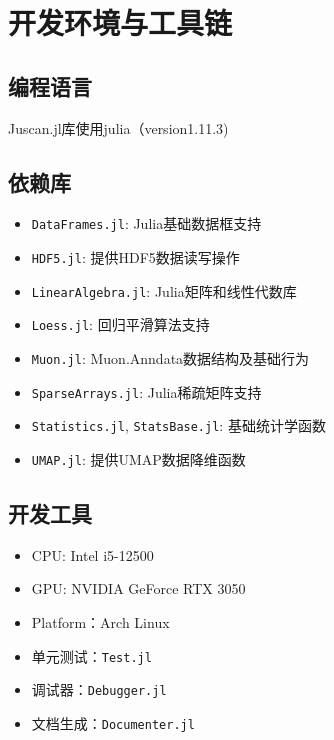 
\section{开发环境与工具链}

\subsection{编程语言}

Juscan.jl库使用julia（version1.11.3)

\subsection{依赖库}

\begin{itemize}
  \setlength{\itemsep}{2pt}
  \item \lstinline|DataFrames.jl|: Julia基础数据框支持
  \item \lstinline|HDF5.jl|: 提供HDF5数据读写操作
  \item \lstinline|LinearAlgebra.jl|: Julia矩阵和线性代数库
  \item \lstinline|Loess.jl|: 回归平滑算法支持
  \item \lstinline|Muon.jl|: Muon.Anndata数据结构及基础行为
  \item \lstinline|SparseArrays.jl|: Julia稀疏矩阵支持
  \item \lstinline|Statistics.jl|, \lstinline|StatsBase.jl|: 基础统计学函数
  \item \lstinline|UMAP.jl|: 提供UMAP数据降维函数
\end{itemize}

\subsection{开发工具}

\begin{itemize}
  \setlength{\itemsep}{2pt}
  \item CPU: Intel i5-12500
  \item GPU: NVIDIA GeForce RTX 3050
  \item Platform：Arch Linux
  \item 单元测试：\lstinline|Test.jl|
  \item 调试器：\lstinline|Debugger.jl|
  \item 文档生成：\lstinline|Documenter.jl|
\end{itemize}

